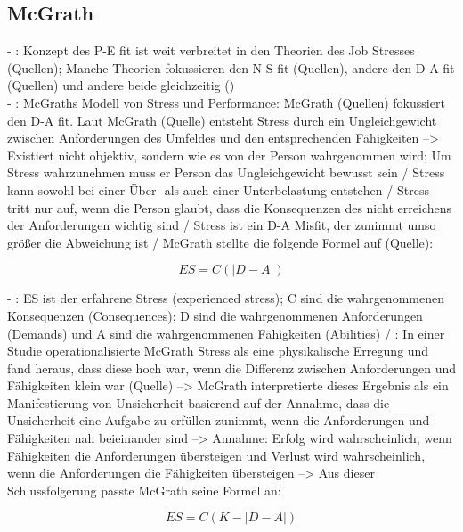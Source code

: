 \subsection{McGrath}
\label{ch:notizen:jobStress:mcgrath}
- \cite[S. 16]{edwards:2008}: Konzept des P-E fit ist weit verbreitet in den Theorien des Job Stresses (Quellen); Manche Theorien fokussieren den N-S fit (Quellen), andere den D-A fit (Quellen) und andere beide gleichzeitig (\cite{mechanismsOfJobStressAndStrain:1982}) \\
- \cite[S. 16]{edwards:2008}: McGraths Modell von Stress und Performance: McGrath (Quellen) fokussiert den D-A fit. Laut McGrath (Quelle) entsteht Stress durch ein Ungleichgewicht zwischen Anforderungen des Umfeldes und den entsprechenden Fähigkeiten --> Existiert nicht objektiv, sondern wie es von der Person wahrgenommen wird; Um Stress wahrzunehmen muss er Person das Ungleichgewicht bewusst sein / Stress kann sowohl bei einer Über- als auch einer Unterbelastung entstehen / Stress tritt nur auf, wenn die Person glaubt, dass die Konsequenzen des nicht erreichens der Anforderungen wichtig sind / Stress ist ein D-A Misfit, der zunimmt umso größer die Abweichung ist / McGrath stellte die folgende Formel auf (Quelle):

\begin{equation}
	ES = C(|D-A|)
	\label{fig:formel2}
\end{equation}

- \cite[S. 16]{edwards:2008}: ES ist der erfahrene Stress (experienced stress); C sind die wahrgenommenen Konsequenzen (Consequences); D sind die wahrgenommenen Anforderungen (Demands) und A sind die wahrgenommenen Fähigkeiten (Abilities) / \cite[S. 17]{edwards:2008}: In einer Studie operationalisierte McGrath Stress als eine physikalische Erregung und fand heraus, dass diese hoch war, wenn die Differenz zwischen Anforderungen und Fähigkeiten klein war (Quelle) --> McGrath interpretierte dieses Ergebnis als ein Manifestierung von Unsicherheit basierend auf der Annahme, dass die Unsicherheit eine Aufgabe zu erfüllen zunimmt, wenn die Anforderungen und Fähigkeiten nah beieinander sind --> Annahme: Erfolg wird wahrscheinlich, wenn Fähigkeiten die Anforderungen übersteigen und Verlust wird wahrscheinlich, wenn die Anforderungen die Fähigkeiten übersteigen --> Aus dieser Schlussfolgerung passte McGrath seine Formel an:

\begin{equation}
	ES = C(K-|D-A|)
	\label{fig:formel3}
\end{equation}

